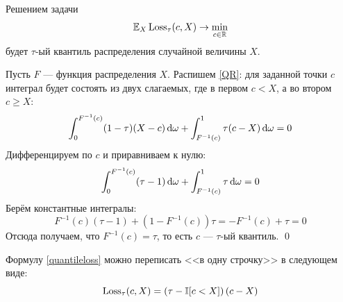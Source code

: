 \begin{theorem} Решением задачи
\begin{equation}\label{QR}
\mathbb{E}_X \operatorname{Loss}_{\tau}(c, X) \to \min_{c \in \mathbb{R}}
\end{equation}
будет $\tau$-ый квантиль распределения случайной величины $X$.

\beginproof
Пусть $F$ --- функция распределения $X$. Распишем \eqref{QR}: для заданной точки $c$ интеграл будет состоять из двух слагаемых, где в первом $c < X$, а во втором $c \ge X$:
\begin{equation*}
\int_0^{F^{-1}(c)} (1 - \tau)(X - c) \mathop{}\!\mathrm{d} \omega + \int_{F^{-1}(c)}^1 \tau (c - X) \mathop{}\!\mathrm{d} \omega = 0 
\end{equation*}
Дифференцируем по $c$ и приравниваем к нулю:
\begin{equation*}
\int_0^{F^{-1}(c)} (\tau - 1) \mathop{}\!\mathrm{d} \omega + \int_{F^{-1}(c)}^1 \tau \mathop{}\!\mathrm{d} \omega = 0 
\end{equation*}
Берём константные интегралы:
\begin{equation*}
F^{-1}(c)(\tau - 1) + (1 - F^{-1}(c)) \tau = -F^{-1}(c) + \tau = 0
\end{equation*}
Отсюда получаем, что $F^{-1}(c) = \tau$, то есть $c$ --- $\tau$-ый квантиль. \qed
\end{theorem}

\begin{proposition}
Формулу \eqref{quantileloss} можно переписать <<в одну строчку>> в следующем виде:
$$\operatorname{Loss}_{\tau}(c, X) = \left( \tau - \mathbb{I}[c < X] \right) \left( c - X \right)$$
\end{proposition}

